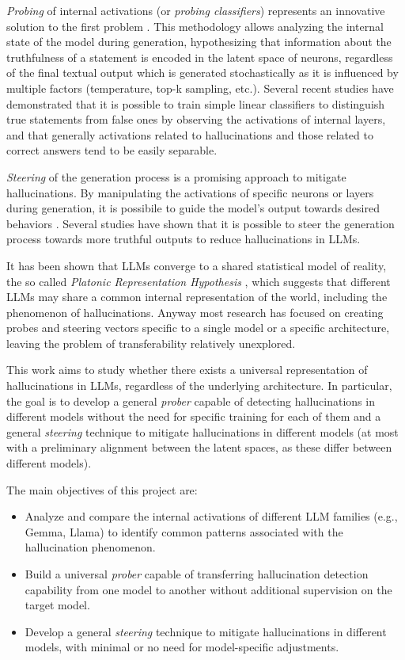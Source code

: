 \textit{Probing} of internal activations (or \textit{probing classifiers}) represents an innovative solution to the first problem \cite{Probing}. This methodology allows analyzing the internal state of the model during generation, hypothesizing that information about the truthfulness of a statement is encoded in the latent space of neurons, regardless of the final textual output which is generated stochastically as it is influenced by multiple factors (temperature, top-k sampling, etc.). 
Several recent studies have demonstrated that it is possible to train simple linear classifiers to distinguish true statements from false ones by observing the activations of internal layers, and that generally activations related to hallucinations and those related to correct answers tend to be easily separable. \cite{Geometry}

\textit{Steering} of the generation process is a promising approach to mitigate hallucinations. By manipulating the activations of specific neurons or layers during generation, it is possibile to guide the model's output towards desired behaviors \cite{SteeringDef}. Several studies have shown that it is possible to steer the generation process towards more truthful outputs to reduce hallucinations in LLMs. \cite{TruthForest} \cite{TruthX} \cite{ITI}


It has been shown that LLMs converge to a shared statistical model of reality, the so called \textit{Platonic Representation Hypothesis} \cite{Platonic}, which suggests that different LLMs may share a common internal representation of the world, including the phenomenon of hallucinations. Anyway most research has focused on creating probes and steering vectors specific to a single model or a specific architecture, leaving the problem of transferability relatively unexplored.

This work aims to study whether there exists a universal representation of hallucinations in LLMs, regardless of the underlying architecture. In particular, the goal is to develop a general \textit{prober} capable of detecting hallucinations in different models without the need for specific training for each of them and a general \textit{steering} technique to mitigate hallucinations in different models (at most with a preliminary alignment between the latent spaces, as these differ between different models).

The main objectives of this project are:
\begin{itemize}
    \item Analyze and compare the internal activations of different LLM families (e.g., Gemma, Llama) to identify common patterns associated with the hallucination phenomenon.
    \item Build a universal \textit{prober} capable of transferring hallucination detection capability from one model to another without additional supervision on the target model.
    \item Develop a general \textit{steering} technique to mitigate hallucinations in different models, with minimal or no need for model-specific adjustments.
\end{itemize}


